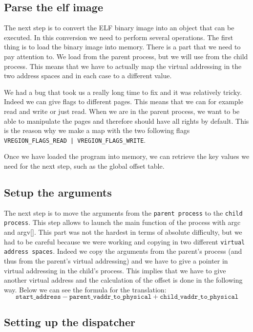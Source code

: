 \subsection{Parse the elf image}

The next step is to convert the ELF binary image into an object that can be executed. In this conversion we need to perform several operations. The first thing is to load the binary image into memory. There is a part that we need to pay attention to. We load from the parent process, but we will use from the child process. This means that we have to actually map the virtual addressing in the two address spaces and in each case to a different value.

We had a bug that took us a really long time to fix and it was relatively tricky. Indeed we can give flags to different pages. This means that we can for example read and write or just read. When we are in the parent process, we want to be able to manipulate the pages and therefore should have all rights by default. This is the reason why we make a map with the two following flags \texttt{VREGION\_FLAGS\_READ | VREGION\_FLAGS\_WRITE}. 

Once we have loaded the program into memory, we can retrieve the key values we need for the next step, such as the global offset table.

\subsection{Setup the arguments}

The next step is to move the arguments from the \texttt{parent process} to the \texttt{child process}. This step allows to launch the main function of the process with argc and argv[]. This part was not the hardest in terms of absolute difficulty, but we had to be careful because we were working and copying in two different \texttt{virtual address spaces}. Indeed we copy the arguments from the parent's process (and thus from the parent's virtual addressing) and we have to give a pointer in virtual addressing in the child's process. This implies that we have to give another virtual address and the calculation of the offset is done in the following way. Below we can see the formula for the translation:
\begin{equation*}
    \texttt{start\_address} - \texttt{parent\_vaddr\_to\_physical} + \texttt{child\_vaddr\_to\_physical}
\end{equation*}

\subsection{Setting up the dispatcher}

